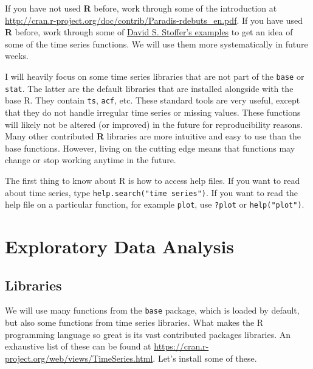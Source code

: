 \documentclass[]{book}
\begin{document}
If you have not used \textbf{R} before, work through some of the
introduction at
\url{http://cran.r-project.org/doc/contrib/Paradis-rdebuts_en.pdf}. If
you have used \textbf{R} before, work through some of
\href{http://www.stat.pitt.edu/stoffer/tsa4/}{David S. Stoffer's
examples} to get an idea of some of the time series functions. We will
use them more systematically in future weeks.

I will heavily focus on some time series libraries that are not part of
the \texttt{base} or \texttt{stat}. The latter are the default libraries
that are installed alongside with the base R. They contain \texttt{ts},
\texttt{acf}, etc. These standard tools are very useful, except that
they do not handle irregular time series or missing values. These
functions will likely not be altered (or improved) in the future for
reproducibility reasons. Many other contributed \textbf{R} libraries are
more intuitive and easy to use than the base functions. However, living
on the cutting edge means that functions may change or stop working
anytime in the future.

The first thing to know about R is how to access help files. If you want
to read about time series, type \texttt{help.search("time\ series")}. If
you want to read the help file on a particular function, for example
\texttt{plot}, use \texttt{?plot} or \texttt{help("plot")}.

\section{Exploratory Data Analysis}\label{exploratory-data-analysis}

\subsection{Libraries}\label{libraries}

We will use many functions from the \texttt{base} package, which is
loaded by default, but also some functions from time series libraries.
What makes the R programming language so great is its vast contributed
packages libraries. An exhaustive list of these can be found at
\url{https://cran.r-project.org/web/views/TimeSeries.html}. Let's
install some of these.
\end{document}
